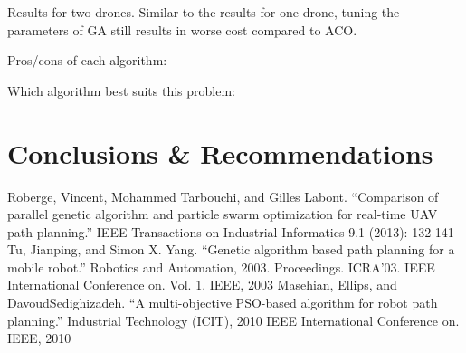\documentclass[conference]{IEEEtran}
\begin{document}
Results for two drones. Similar to the results for one drone, tuning the parameters of GA still results in worse cost compared to ACO. 

Pros/cons of each algorithm:  

Which algorithm best suits this problem:

\section{Conclusions \& Recommendations}
\blindtext

\begin{thebibliography}{00}
 Roberge, Vincent, Mohammed Tarbouchi, and Gilles Labont. ``Comparison of parallel genetic algorithm and particle swarm optimization for real-time UAV path planning.'' IEEE Transactions on Industrial Informatics 9.1 (2013): 132-141
 Tu, Jianping, and Simon X. Yang. ``Genetic algorithm based path planning for a mobile robot.'' Robotics and Automation, 2003. Proceedings. ICRA'03. IEEE International Conference on. Vol. 1. IEEE, 2003
 Masehian, Ellips, and DavoudSedighizadeh. ``A multi-objective PSO-based algorithm for robot path planning.'' Industrial Technology (ICIT), 2010 IEEE International Conference on. IEEE, 2010
\end{thebibliography}
\end{document}
